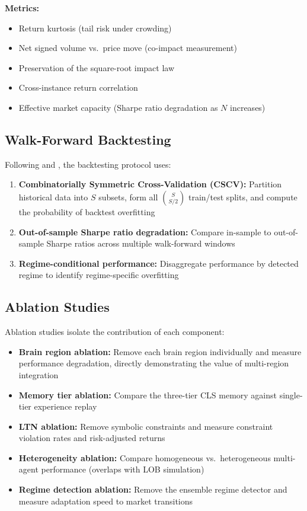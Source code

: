 \documentclass[12pt, a4paper]{article}
\begin{document}
\textbf{Metrics:}
\begin{itemize}
	\item Return kurtosis (tail risk under crowding)
	\item Net signed volume vs.\ price move (co-impact measurement)
	\item Preservation of the square-root impact law \citep{toth2011anomalous}
	\item Cross-instance return correlation
	\item Effective market capacity (Sharpe ratio degradation as $N$ increases)
\end{itemize}

\subsection{Walk-Forward Backtesting}

Following \citet{bailey2015backtest} and \citet{lopezdeprado2018advances}, the backtesting protocol uses:

\begin{enumerate}
	\item \textbf{Combinatorially Symmetric Cross-Validation (CSCV):} Partition historical data into $S$ subsets, form all $\binom{S}{S/2}$ train/test splits, and compute the probability of backtest overfitting
	\item \textbf{Out-of-sample Sharpe ratio degradation:} Compare in-sample to out-of-sample Sharpe ratios across multiple walk-forward windows
	\item \textbf{Regime-conditional performance:} Disaggregate performance by detected regime to identify regime-specific overfitting
\end{enumerate}

\subsection{Ablation Studies}

Ablation studies isolate the contribution of each component:

\begin{itemize}
	\item \textbf{Brain region ablation:} Remove each brain region individually and measure performance degradation, directly demonstrating the value of multi-region integration
	\item \textbf{Memory tier ablation:} Compare the three-tier CLS memory against single-tier experience replay
	\item \textbf{LTN ablation:} Remove symbolic constraints and measure constraint violation rates and risk-adjusted returns
	\item \textbf{Heterogeneity ablation:} Compare homogeneous vs.\ heterogeneous multi-agent performance (overlaps with LOB simulation)
	\item \textbf{Regime detection ablation:} Remove the ensemble regime detector and measure adaptation speed to market transitions
\end{itemize}
\end{document}
